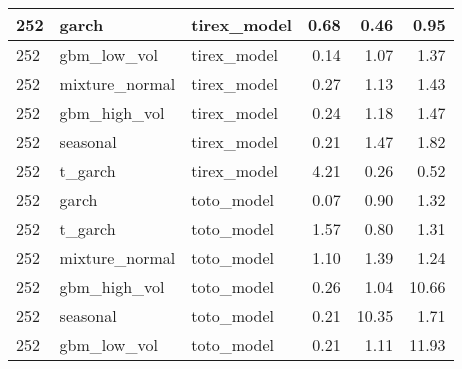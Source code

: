 {\begin{tabular}{lllrrr}
\midrule
252 & garch & tirex\_model & 0.68 & 0.46 & 0.95 \\
\midrule
252 & gbm\_low\_vol & tirex\_model & 0.14 & 1.07 & 1.37 \\
\midrule
252 & mixture\_normal & tirex\_model & 0.27 & 1.13 & 1.43 \\
\midrule
252 & gbm\_high\_vol & tirex\_model & 0.24 & 1.18 & 1.47 \\
\midrule
252 & seasonal & tirex\_model & 0.21 & 1.47 & 1.82 \\
\midrule
252 & t\_garch & tirex\_model & 4.21 & 0.26 & 0.52 \\
\midrule
252 & garch & toto\_model & 0.07 & 0.90 & 1.32 \\
\midrule
252 & t\_garch & toto\_model & 1.57 & 0.80 & 1.31 \\
\midrule
252 & mixture\_normal & toto\_model & 1.10 & 1.39 & 1.24 \\
\midrule
252 & gbm\_high\_vol & toto\_model & 0.26 & 1.04 & 10.66 \\
\midrule
252 & seasonal & toto\_model & 0.21 & 10.35 & 1.71 \\
\midrule
252 & gbm\_low\_vol & toto\_model & 0.21 & 1.11 & 11.93 \\
\bottomrule
\end{tabular}
}